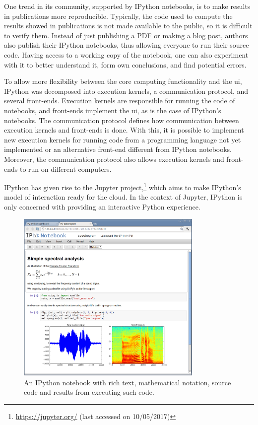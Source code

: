 One trend in its community, supported by IPython notebooks, is to make results in publications more reproducible.
Typically, the code used to compute the results showed in publications is not made available to the public, so it is difficult to verify them.
Instead of just publishing a PDF or making a blog post, authors also publish their IPython notebooks, thus allowing everyone to run their source code.
Having access to a working copy of the notebook, one can also experiment with it to better understand it, form own conclusions, and find potential errors.

To allow more flexibility between the core computing functionality and the \gls{ui}, IPython was decomposed into execution kernels, a communication protocol, and several front-ends.
Execution kernels are responsible for running the code of notebooks, and front-ends implement the \gls{ui}, as is the case of IPython's notebooks.
The communication protocol defines how communication between execution kernels and front-ends is done.
With this, it is possible to implement new execution kernels for running code from a programming language not yet implemented or an alternative front-end different from IPython notebooks.
Moreover, the communication protocol also allows execution kernels and front-ends to run on different computers\cite{PER-GRA:2007}.

IPython has given rise to the Jupyter project,\footnote{\url{https://jupyter.org/} (last accessed on 10/05/2017)} which aims to make IPython's model of interaction ready for the cloud.
In the context of Jupyter, IPython is only concerned with providing an interactive Python experience.

\begin{figure}
	\centering
	\includegraphics[width=0.8\textwidth]{images/ipython_notebook}
	\caption{An IPython notebook with rich text, mathematical notation, source code and results from executing such code.}
	\label{fig:ipython:notebook}
\end{figure}


